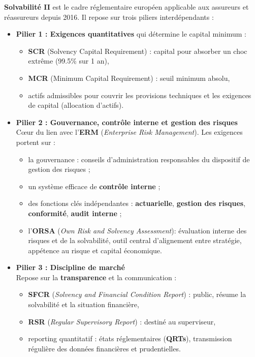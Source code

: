 	
\begin{f}
	
	\textbf{Solvabilité II} est le cadre réglementaire européen applicable aux assureurs et réassureurs depuis 2016. Il repose sur trois piliers interdépendants :
	
	\begin{itemize}
		\item \textbf{Pilier 1 : Exigences quantitatives}  qui détermine le capital minimum :\\
		
		\begin{itemize}
			\item \textbf{SCR} (Solvency Capital Requirement) : capital pour absorber un choc extrême (99.5\% sur 1 an),
			\item \textbf{MCR} (Minimum Capital Requirement) : seuil minimum absolu,
			\item actifs admissibles pour couvrir les provisions techniques et les exigences de capital (allocation d'actifs).
		\end{itemize}
		
		\item \textbf{Pilier 2 : Gouvernance, contrôle interne et gestion des risques} \\
		Cœur du lien avec l'\textbf{ERM} (\emph{Enterprise Risk Management}). Les exigences portent sur :
		\begin{itemize}
			\item la gouvernance : conseils d'administration responsables du dispositif de gestion des risques ;
			\item un système efficace de \textbf{contrôle interne} ;
			\item des fonctions clés indépendantes : \textbf{actuarielle}, \textbf{gestion des risques}, \textbf{conformité}, \textbf{audit interne} ;
			\item l'\textbf{ORSA} (\emph{Own Risk and Solvency Assessment}): évaluation interne des risques et de la solvabilité, outil central d'alignement entre stratégie, appétence au risque et capital économique.
		\end{itemize}
		
		\item \textbf{Pilier 3 : Discipline de marché} \\
		Repose sur la \textbf{transparence} et la communication :
		\begin{itemize}
			\item \textbf{SFCR} (\emph{Solvency and Financial Condition Report}) : public, résume la solvabilité et la situation financière,
			\item \textbf{RSR} (\emph{Regular Supervisory Report}) : destiné au superviseur,
			\item reporting quantitatif : états réglementaires (\textbf{QRTs}), transmission régulière des données financières et prudentielles.
		\end{itemize}
	\end{itemize}
		
\end{f}
